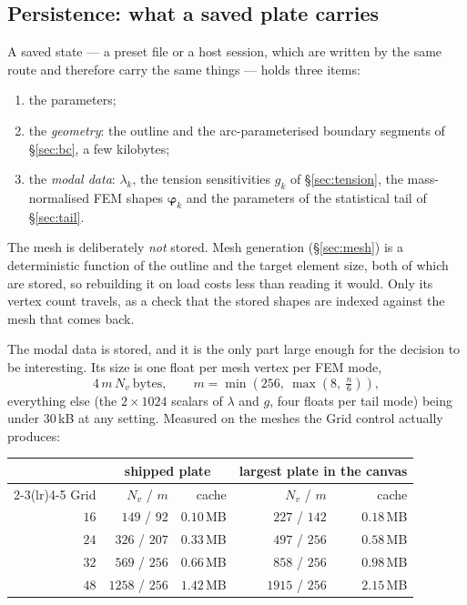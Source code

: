 \documentclass[11pt,a4paper]{article}
\begin{document}
\subsection{Persistence: what a saved plate carries}
\label{sec:persistence}

A saved state --- a preset file or a host session, which are written by the
same route and therefore carry the same things --- holds three items:

\begin{enumerate}
\item the parameters;
\item the \emph{geometry}: the outline and the arc-parameterised boundary
  segments of \S\ref{sec:bc}, a few kilobytes;
\item the \emph{modal data}: $\lambda_k$, the tension sensitivities $g_k$ of
  \S\ref{sec:tension}, the mass-normalised FEM shapes $\bm\varphi_k$ and the
  parameters of the statistical tail of \S\ref{sec:tail}.
\end{enumerate}

The mesh is deliberately \emph{not} stored. Mesh generation
(\S\ref{sec:mesh}) is a deterministic function of the outline and the target
element size, both of which are stored, so rebuilding it on load costs less
than reading it would. Only its vertex count travels, as a check that the
stored shapes are indexed against the mesh that comes back.

The modal data is stored, and it is the only part large enough for the
decision to be interesting. Its size is one float per mesh vertex per FEM
mode,
%
\begin{equation}
  4\, m\, N_v \ \text{bytes},
  \qquad m = \min\!\left(256,\ \max\!\left(8,\ \tfrac{n}{6}\right)\right),
  \label{eq:cachesize}
\end{equation}
%
everything else (the $2 \times 1024$ scalars of $\lambda$ and $g$, four floats
per tail mode) being under $30$\,kB at any setting. Measured on the meshes the
Grid control actually produces:

\begin{center}
\begin{tabular}{rrrrr}
\toprule
& \multicolumn{2}{c}{shipped plate} & \multicolumn{2}{c}{largest plate in the canvas} \\
\cmidrule(lr){2-3}\cmidrule(lr){4-5}
Grid & $N_v$ / $m$ & cache & $N_v$ / $m$ & cache \\
\midrule
$16$ & $149$ / $92$   & $0.10$\,MB & $227$ / $142$  & $0.18$\,MB \\
$24$ & $326$ / $207$  & $0.33$\,MB & $497$ / $256$  & $0.58$\,MB \\
$32$ & $569$ / $256$  & $0.66$\,MB & $858$ / $256$  & $0.98$\,MB \\
$48$ & $1258$ / $256$ & $1.42$\,MB & $1915$ / $256$ & $2.15$\,MB \\
\bottomrule
\end{tabular}
\end{center}
\end{document}
